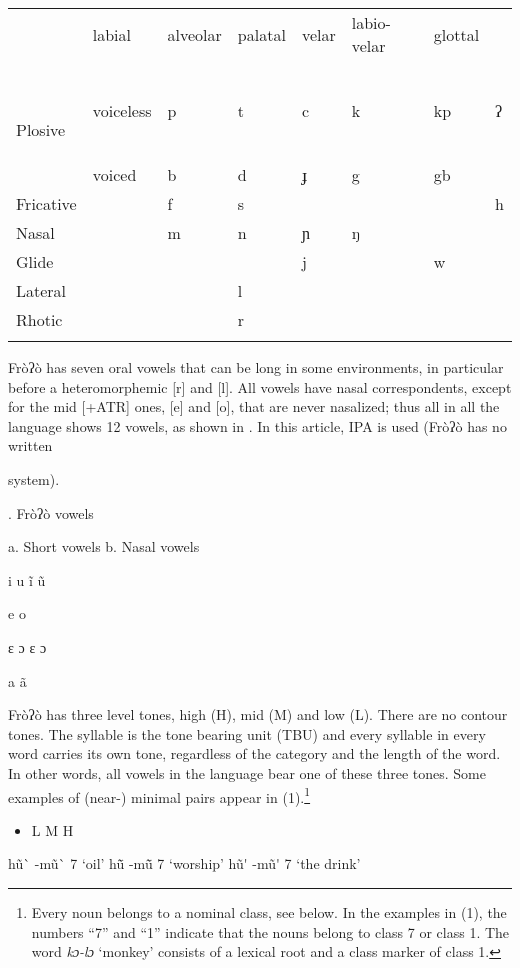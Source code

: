 \begin{tabularx}{\textwidth}{XXXXXXXX}
\lsptoprule
\hhline{~~------}
\multicolumn{2}{X}{\textbf{\tabref{tab:key:1}}. Fròʔò consonants} & labial & alveolar & palatal & velar & labio-velar & glottal\\
~

Plosive & voiceless & p & t & c & k & kp & ʔ\\
& voiced & b & d & ɟ & g & gb & \\
Fricative &  & f & s &  &  &  & h\\
Nasal &  & m & n & ɲ & ŋ &  & \\
Glide &  &  &  & j &  & w & \\
Lateral &  &  & l &  &  &  & \\
Rhotic &  &  & r &  &  &  & \\
\lspbottomrule
\end{tabularx}
Fròʔò has seven oral vowels that can be long in some environments, in particular before a heteromorphemic [r] and [l]. All vowels have nasal correspondents, except for the mid [+ATR] ones, [e] and [o], that are never nasalized; thus all in all the language shows 12 vowels, as shown in . In this article, IPA is used (Fròʔò has no written 

system).

\textbf{}. Fròʔò vowels

 a. Short vowels    b. Nasal vowels  

 i                  u    ĩ             ũ        

    e                 o                

       ɛ           ɔ       ɛ         ɔ        

   a        ã  

Fròʔò has three level tones, high (H), mid (M) and low (L). There are no contour tones. The syllable is the tone bearing unit (TBU) and every syllable in every word carries its own tone, regardless of the category and the length of the word. In other words, all vowels in the language bear one of these three tones. Some examples of (near-) minimal pairs appear in (1).\footnote{Every noun belongs to a nominal class, see below. In the examples in (1), the numbers “7” and “1” indicate that the nouns belong to class 7 or class 1. The word \textit{kɔ-lɔ} ‘monkey’ consists of a lexical root and a class marker of class 1.}

\begin{itemize}
\item \begin{styleindexi}
     \label{bkm:Ref499525658}L                               M                                H
\end{styleindexi}\end{itemize}
\begin{styleindexi}
hũ\`{} -mũ\`{} 7 ‘oil’                 hũ\={} -mũ\={} 7   ‘worship’       hũ\'{} -mũ\'{} 7 ‘the drink’
\end{styleindexi}

